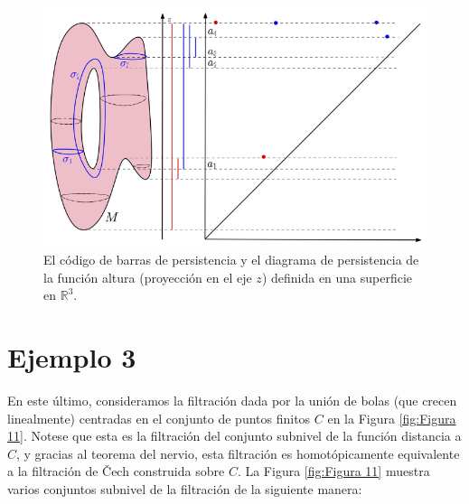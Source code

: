 \begin{figure}[ht]
    \centering
    \includegraphics[width=0.85\linewidth]{./figures/Figura10.png}
    \caption{
        El c\'odigo de barras de persistencia y el diagrama de persistencia de la funci\'on altura
        (proyecci\'on en el eje $z$) definida en una superficie en $\mathbb{R}^{3}$.
    }
    \label{fig:Figura 10}
    \vspace{15pt}
\end{figure}

\section*{Ejemplo 3}

En este \'ultimo, consideramos la filtraci\'on dada por la uni\'on de bolas
(que crecen linealmente)
centradas en el conjunto de puntos finitos $C$ en la Figura \ref{fig:Figura 11}.
Notese que esta es la filtraci\'on del conjunto subnivel de la funci\'on distancia a $C$,
y gracias al teorema del nervio,
esta filtraci\'on es homot\'opicamente equivalente a la filtraci\'on de \v Cech construida sobre $C$.
La Figura \ref{fig:Figura 11} muestra varios conjuntos subnivel de la filtraci\'on de la siguiente manera:

